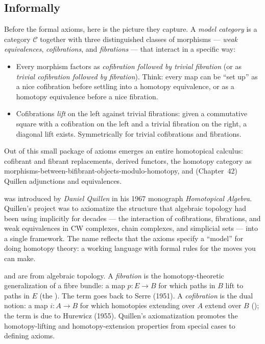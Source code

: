 \subsection{Informally}

Before the formal axioms, here is the picture they capture. A
\emph{model category} is a category $\mathcal{C}$ together with three
distinguished classes of morphisms — \emph{weak equivalences},
\emph{cofibrations}, and \emph{fibrations} — that interact in a
specific way:

\begin{itemize}
  \item Every morphism factors as \emph{cofibration followed by trivial
        fibration} (or as \emph{trivial cofibration followed by
        fibration}). Think: every map can be ``set up'' as a nice
        cofibration before settling into a homotopy equivalence, or as
        a homotopy equivalence before a nice fibration.
  \item Cofibrations \emph{lift} on the left against trivial
        fibrations: given a commutative square with a cofibration on
        the left and a trivial fibration on the right, a diagonal lift
        exists. Symmetrically for trivial cofibrations and fibrations.
\end{itemize}

Out of this small package of axioms emerges an entire homotopical
calculus: cofibrant and fibrant replacements, derived functors, the
homotopy category as morphisms-between-bifibrant-objects-modulo-homotopy,
and (Chapter~42) Quillen adjunctions and equivalences.

\begin{nameorigin}
 was introduced by \emph{Daniel Quillen} in his
1967 monograph \emph{Homotopical Algebra}. Quillen's project was to
axiomatize the structure that algebraic topology had been using
implicitly for decades — the interaction of cofibrations, fibrations,
and weak equivalences in CW complexes, chain complexes, and simplicial
sets — into a single framework. The name reflects that the axioms
specify a ``model'' for doing homotopy theory: a working language with
formal rules for the moves you can make.
\end{nameorigin}

\begin{nameorigin}
 and  are from algebraic topology.
A \emph{fibration} is the homotopy-theoretic generalization of a
fibre bundle: a map $p : E \to B$ for which paths in $B$ lift to paths
in $E$ (the ). The term goes back to
Serre (1951). A \emph{cofibration} is the dual notion: a map $i : A
\to B$ for which homotopies extending over $A$ extend over $B$
(); the term is due to Hurewicz
(1955). Quillen's axiomatization promotes the homotopy-lifting and
homotopy-extension properties from special cases to defining axioms.
\end{nameorigin}

